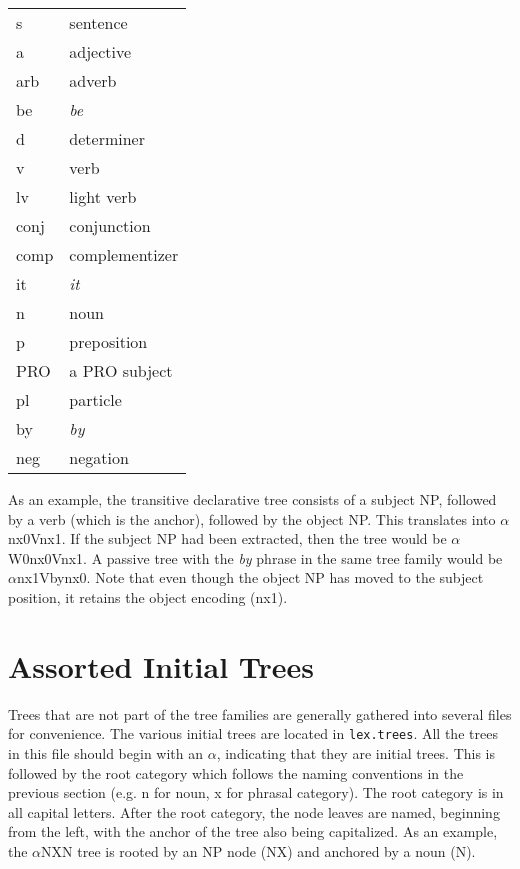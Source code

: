 \begin{description} 
\item\begin{tabular}{ll} 
s&sentence\\ 
a&adjective\\ 
arb&adverb\\ 
be&{\it be}\\ 
d&determiner\\ 
v&verb\\ 
lv&light verb\\ 
conj&conjunction\\ 
comp&complementizer\\ 
it&{\it it}\\ 
n&noun\\ 
p&preposition\\ 
PRO&a PRO subject \\ 
pl&particle\\ 
by&{\it by}\\ 
neg&negation\\ 
\end{tabular} 
\end{description} 
 
\noindent As an example, the transitive declarative tree consists of a subject 
NP, followed by a verb (which is the anchor), followed by the object NP.  This 
translates into $\alpha$nx0Vnx1.  If the subject NP had been extracted, then 
the tree would be $\alpha$W0nx0Vnx1.  A passive tree with the {\it by} phrase 
in the same tree family would be $\alpha$nx1Vbynx0.  Note that even though the 
object NP has moved to the subject position, it retains the object encoding 
(nx1). 
 
\section{Assorted Initial Trees} 
 
Trees that are not part of the tree families are generally gathered into 
several files for convenience.  The various initial trees are located in {\tt lex.trees}.  All the trees in this file should begin with an $\alpha$, 
indicating that they are initial trees.  This is followed by the root category 
which follows the naming conventions in the previous section (e.g. n for noun, 
x for phrasal category).  The root category is in all capital letters.  After 
the root category, the node leaves are named, beginning from the left, with the 
anchor of the tree also being capitalized.  As an example, the $\alpha$NXN 
tree is rooted by an NP node (NX) and anchored by a noun (N). 
 
